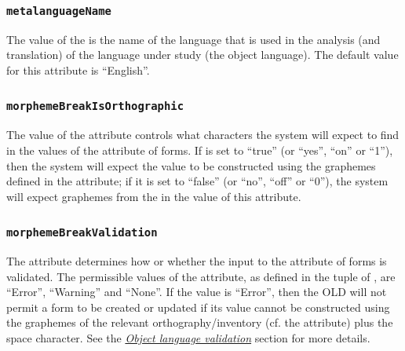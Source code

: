 \documentclass[letterpaper,10pt,english]{sphinxmanual}
\begin{document}
\subsubsection{\texttt{metalanguageName}}
\label{datastructure:metalanguagename}
The value of the  is the name of the language that is used
in the analysis (and translation) of the language under study (the object
language).  The default value for this attribute is ``English''.


\subsubsection{\texttt{morphemeBreakIsOrthographic}}
\label{datastructure:morphemebreakisorthographic}
The value of the  attribute controls what
characters the system will expect to find in the values of the 
attribute of forms.  If  is set to ``true'' (or
``yes'', ``on'' or ``1''), then the system will expect the  value to
be constructed using the graphemes defined in the 
attribute; if it is set to ``false'' (or ``no'', ``off'' or ``0''), the system will
expect graphemes from the  in the value of this attribute.


\subsubsection{\texttt{morphemeBreakValidation}}
\label{datastructure:morphemebreakvalidation}
The  attribute determines how or whether the input to
the  attribute of forms is validated.  The permissible values
of the  attribute, as defined in the
 tuple of , are ``Error'', ``Warning'' and
``None''.  If the value is ``Error'', then the OLD will not permit a form to be
created or updated if its  value cannot be constructed using
the graphemes of the relevant orthography/inventory (cf. the
 attribute) plus the space character.  See the
{\hyperref[interface:object-language-validation]{\emph{Object language validation}}} section for more details.
\end{document}
